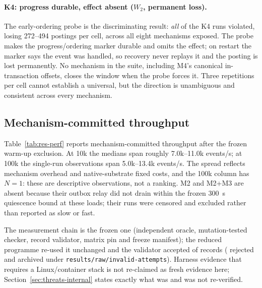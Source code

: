 \paragraph{K4: progress durable, effect absent ($W_2$, permanent loss).} The early-ordering probe
is the discriminating result: \emph{all} \ResFaultKFourViolatingRuns{} of the
\ResFaultKFourValidRuns{} K4 runs violated, losing 272--494 postings per cell, across all eight
mechanisms exposed. The probe makes the progress/ordering marker durable and omits the effect; on
restart the marker says the event was handled, so recovery never replays it and the posting is lost
permanently. No mechanism in the suite, including M4's canonical in-transaction offsets, closes the
window when the probe forces it. Three repetitions per cell cannot establish a universal, but the
direction is unambiguous and consistent across every mechanism.

\subsection{Mechanism-committed throughput}
\label{sec:results:performance}

Table~\ref{tab:res-perf} reports mechanism-committed throughput after the frozen warm-up exclusion.
At 10k the medians span roughly 7.0k--11.0k events/s; at 100k the single-run observations span
5.0k--13.4k events/s. The spread reflects mechanism overhead and native-substrate fixed costs, and
the 100k column has $N=1$: these are descriptive observations, not a ranking. M2 and M2+M3 are
absent because their outbox relay did not drain within the frozen 300~s quiescence bound at these
loads; their runs were censored and excluded rather than reported as slow or fast.

\begin{table}[t]
\centering
\footnotesize
\caption{Mechanism-committed throughput (events/s) after the frozen warm-up exclusion; $n$ is the
number of non-censored valid measurements. Descriptive only: 10k $N=3$, 100k $N=1$; no ranking is
claimed.}
\label{tab:res-perf}

\end{table}

The measurement chain is the frozen one (independent oracle, mutation-tested checker, record
validator, matrix pin and freeze manifest); the reduced programme re-used it unchanged and the
validator accepted \ResTotalValidRuns{} of \ResTotalRecords{} records
(\ResTotalExcludedRuns{} rejected and archived under \texttt{results/raw/invalid-attempts}). Harness
evidence that requires a Linux/container stack is not re-claimed as fresh evidence here;
Section~\ref{sec:threats-internal} states exactly what was and was not re-verified.
